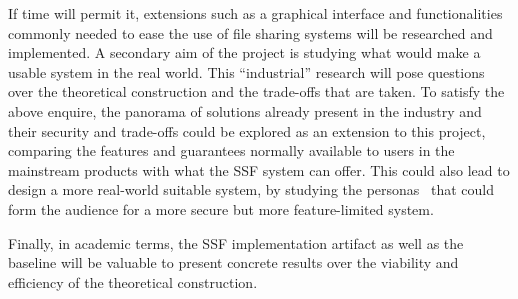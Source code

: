 \documentclass[E]{BAMASA}
\begin{document}
If time will permit it, extensions such as a graphical interface and functionalities 
commonly needed to ease the use of file sharing systems will be researched and implemented.
A secondary aim of the project is studying what would make a usable system in the real world.
This ``industrial'' research will pose questions over the theoretical construction and the 
trade-offs that are taken.
To satisfy the above enquire, the panorama of solutions already present in the industry and 
their security and trade-offs could be explored as an extension to this project, comparing
the features and guarantees normally available to users in the mainstream products with what
the SSF system can offer.
This could also lead to design a more real-world suitable system, by studying the personas~\cite{norman2002design} 
that could form the audience for a more secure but more feature-limited system.

Finally, in academic terms, the SSF implementation artifact as well as the baseline will be
valuable to present concrete results 
over the viability and efficiency of the theoretical construction.
\end{document}
